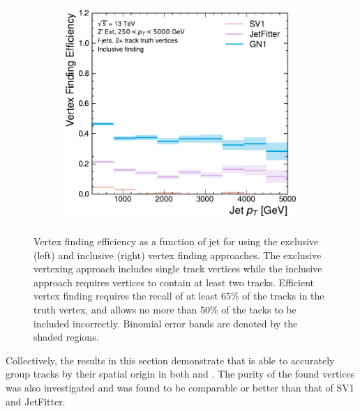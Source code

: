 \begin{figure}[!htbp]
\begin{subfigure}[b]{0.48\textwidth}
        \includegraphics[width=\textwidth]{chapters/gnn_tagger/figs/results/tracks/zprime/zprime_ljet_vert_eff_2+_track_incl.pdf}
    \end{subfigure}
    \caption{
        Vertex finding efficiency as a function of jet \pt for \Zprimeljets using the exclusive (left) and inclusive (right) vertex finding approaches.
        The exclusive vertexing approach includes single track vertices while the inclusive approach requires vertices to contain at least two tracks.
        Efficient vertex finding requires the recall of at least $65\%$ of the tracks in the truth vertex, and allows no more than $50\%$ of the tacks to be included incorrectly.
        Binomial error bands are denoted by the shaded regions.
        }
    \label{fig:zprime_vert_leff}
\end{figure}


Collectively, the results in this section demonstrate that \GNN is able to accurately group tracks by their spatial origin in both \bjets and \ljets.
The purity of the found vertices was also investigated and was found to be comparable or better than that of SV1 and JetFitter.



